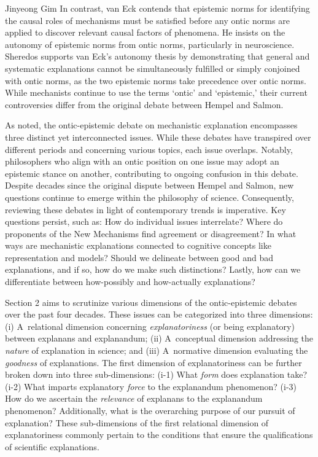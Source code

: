 \begin{artengenv}{Jinyeong Gim}
In contrast, van Eck
\parencite*[][]{van_eck_reconciling_2015} %
 contends that epistemic norms for identifying the causal roles of mechanisms must be satisfied before any ontic norms are applied to discover relevant causal factors of phenomena. He insists on the autonomy of epistemic norms from ontic norms, particularly in neuroscience. Sheredos 
\parencite*[][]{sheredos_re-reconciling_2016} %
 supports van Eck's autonomy thesis by demonstrating that general and systematic explanations cannot be simultaneously fulfilled or simply conjoined with ontic norms, as the two epistemic norms take precedence over ontic norms. While mechanists continue to use the terms ‘ontic' and ‘epistemic,' their current controversies differ from the original debate between Hempel and Salmon.

As noted, the ontic-epistemic debate on mechanistic explanation encompasses three distinct yet interconnected issues. While these debates have transpired over different periods and concerning various topics, each issue overlaps. Notably, philosophers who align with an ontic position on one issue may adopt an epistemic stance on another, contributing to ongoing confusion in this debate. Despite decades since the original dispute between Hempel and Salmon, new questions continue to emerge within the philosophy of science. Consequently, reviewing these debates in light of contemporary trends is imperative. Key questions persist, such as: How do individual issues interrelate? Where do proponents of the New Mechanisms find agreement or disagreement? In what ways are mechanistic explanations connected to cognitive concepts like representation and models? Should we delineate between good and bad explanations, and if so, how do we make such distinctions? Lastly, how can we differentiate between how-possibly and how-actually explanations?

Section 2 aims to scrutinize various dimensions of the ontic-epistemic debates over the past four decades. These issues can be categorized into three dimensions: (i) A~relational dimension concerning \textit{explanatoriness} (or being explanatory) between explanans and explanandum; (ii) A~conceptual dimension addressing the \textit{nature} of explanation in science; and (iii) A~normative dimension evaluating the \textit{goodness} of explanations. The first dimension of explanatoriness can be further broken down into three sub-dimensions: (i-1) What \textit{form} does explanation take? (i-2) What imparts explanatory \textit{force} to the explanandum phenomenon? (i-3) How do we ascertain the \textit{relevance} of explanans to the explanandum phenomenon? Additionally, what is the overarching purpose of our pursuit of explanation? These sub-dimensions of the first relational dimension of explanatoriness commonly pertain to the conditions that ensure the qualifications of scientific explanations.


\end{artengenv}
